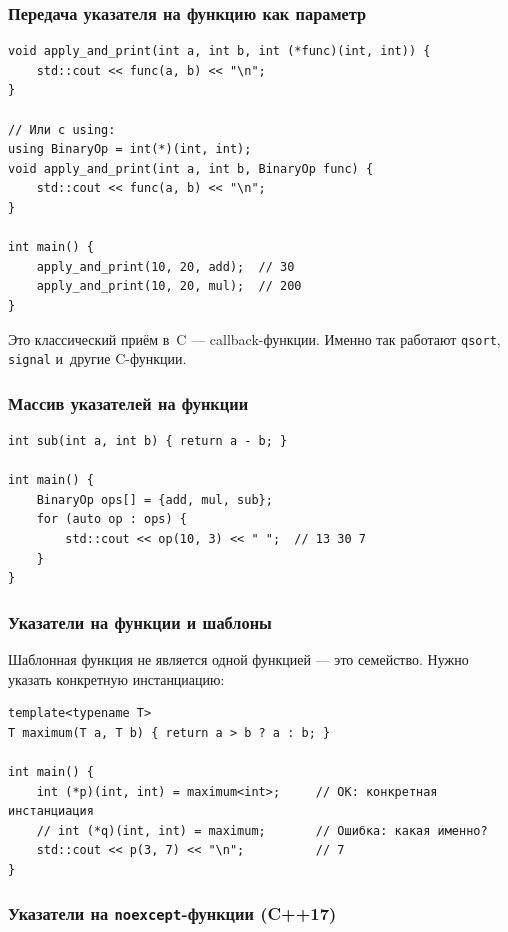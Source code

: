 \documentclass[a4paper,12pt]{article}
\begin{document}
\subsubsection{Передача указателя на функцию как параметр}

\begin{lstlisting}
void apply_and_print(int a, int b, int (*func)(int, int)) {
    std::cout << func(a, b) << "\n";
}

// Или с using:
using BinaryOp = int(*)(int, int);
void apply_and_print(int a, int b, BinaryOp func) {
    std::cout << func(a, b) << "\n";
}

int main() {
    apply_and_print(10, 20, add);  // 30
    apply_and_print(10, 20, mul);  // 200
}
\end{lstlisting}

Это классический приём в~C --- callback-функции. Именно так работают
\texttt{qsort}, \texttt{signal} и~другие C-функции.

\subsubsection{Массив указателей на функции}

\begin{lstlisting}
int sub(int a, int b) { return a - b; }

int main() {
    BinaryOp ops[] = {add, mul, sub};
    for (auto op : ops) {
        std::cout << op(10, 3) << " ";  // 13 30 7
    }
}
\end{lstlisting}

\subsubsection{Указатели на функции и шаблоны}

Шаблонная функция не является одной функцией --- это семейство.
Нужно указать конкретную инстанциацию:

\begin{lstlisting}
template<typename T>
T maximum(T a, T b) { return a > b ? a : b; }

int main() {
    int (*p)(int, int) = maximum<int>;     // OK: конкретная инстанциация
    // int (*q)(int, int) = maximum;       // Ошибка: какая именно?
    std::cout << p(3, 7) << "\n";          // 7
}
\end{lstlisting}

\subsubsection{Указатели на \texttt{noexcept}-функции (C++17)}
\end{document}
